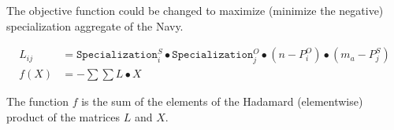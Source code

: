 The objective function could be changed to maximize (minimize the negative) specialization aggregate of the Navy.

\begin{align}
L_{ij} &= \texttt{Specialization}^S_i \bullet \texttt{Specialization}^O_j \bullet (n - P_i^O) \bullet (m_a - P_j^S) \\
f(X) &= - \sum \sum L \bullet X
\end{align}

The function $f$ is the sum of the elements of the Hadamard (elementwise) product of the matrices $L$ and $X$.